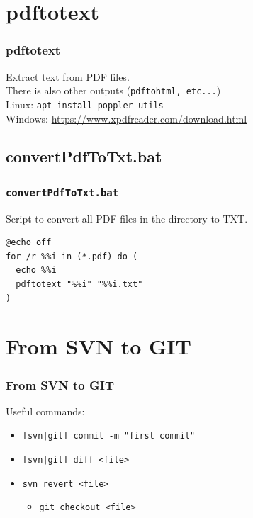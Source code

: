 \documentclass[pdf]{beamer}
\newcommand{\mono}[1]{\texttt{#1}}
\begin{document}
\section{pdftotext}
\begin{frame}
  \frametitle{pdftotext}
  Extract text from PDF files.\\
  There is also other outputs (\mono{pdftohtml, etc...})\\
  Linux: \mono{apt install poppler-utils}\\
  Windows: \url{https://www.xpdfreader.com/download.html}
\end{frame}


\subsection{convertPdfToTxt.bat}
\begin{frame}[fragile] %
  \frametitle{\mono{convertPdfToTxt.bat}}
  Script to convert all PDF files in the directory to TXT.
    \begin{lstlisting}
@echo off
for /r %%i in (*.pdf) do (
  echo %%i
  pdftotext "%%i" "%%i.txt"
)
    \end{lstlisting}
\end{frame}






\section{From SVN to GIT}
\begin{frame}
  \frametitle{From SVN to GIT}
  Useful commands:
  \begin{itemize}
    \item \mono{[svn|git] commit -m "first commit"}
    \item \mono{[svn|git] diff <file>}
    
    \item \mono{svn revert <file>}
      \begin{itemize}
      \item \mono{git checkout <file>}
      \end{itemize}
  \end{itemize}
\end{frame}
\end{document}
